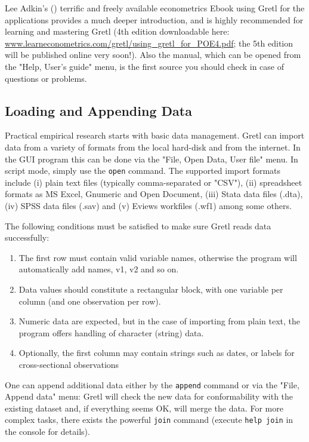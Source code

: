 \documentclass[11pt]{article}
\begin{document}
Lee Adkin's (\citeyear{Adkins2014}) terrific and freely available econometrics Ebook using Gretl for the applications provides a much deeper introduction, and is highly recommended for learning and mastering Gretl (4th edition downloadable here: \\ \url{www.learneconometrics.com/gretl/using_gretl_for_POE4.pdf}; the 5th edition will be published online very soon!). Also the manual, which can be opened from the "Help, User's guide" menu, is the first source you should check in case of questions or problems.



\subsection{Loading and Appending Data}
\label{sec:dataloadappend}
Practical empirical research starts with basic data management. Gretl can import data from a variety of formats from the local hard-disk and from the internet. In the GUI program this can be done via the "File, Open Data, User file" menu. In script mode, simply use the \texttt{open} command. The supported import formats include (i) plain text files (typically comma-separated or "CSV"), (ii) spreadsheet formats as MS Excel, Gnumeric and Open Document, (iii) Stata data files (.dta), (iv) SPSS data files (.sav) and (v) Eviews workfiles (.wf1) among some others.

The following conditions must be satisfied to make sure Gretl reads data successfully:
\begin{enumerate}
	\item The first row must contain valid variable names, otherwise the program will automatically add names, v1, v2 and so on.
	\item Data values should constitute a rectangular block, with one variable per column (and one observation per row).
	\item Numeric data are expected, but in	the case of importing from plain text, the program offers handling of character (string) data.
	\item Optionally, the first column may contain strings such as	dates, or labels for cross-sectional observations
\end{enumerate}

One can append additional data either by the \texttt{append} command or via the "File, Append data" menu: Gretl will check the
new data for conformability with the existing dataset and, if everything seems OK, will merge the data. For more complex tasks, there exists the powerful \texttt{join} command (execute \texttt{help join} in the console for details).
\end{document}
